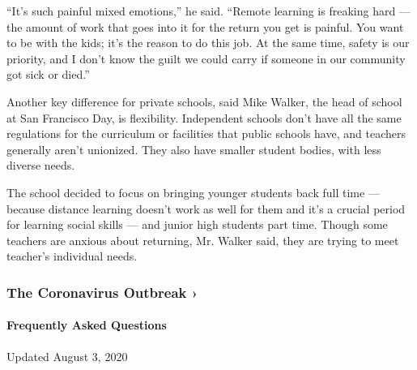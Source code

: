 ``It's such painful mixed emotions,'' he said. ``Remote learning is
freaking hard --- the amount of work that goes into it for the return
you get is painful. You want to be with the kids; it's the reason to do
this job. At the same time, safety is our priority, and I don't know the
guilt we could carry if someone in our community got sick or died.''

Another key difference for private schools, said Mike Walker, the head
of school at San Francisco Day, is flexibility. Independent schools
don't have all the same regulations for the curriculum or facilities
that public schools have, and teachers generally aren't unionized. They
also have smaller student bodies, with less diverse needs.

The school decided to focus on bringing younger students back full time
--- because distance learning doesn't work as well for them and it's a
crucial period for learning social skills --- and junior high students
part time. Though some teachers are anxious about returning, Mr. Walker
said, they are trying to meet teacher's individual needs.

\href{https://www.nytimes.com/news-event/coronavirus?action=click\&pgtype=Article\&state=default\&region=MAIN_CONTENT_3\&context=storylines_faq}{}

\hypertarget{the-coronavirus-outbreak-}{%
\subsubsection{The Coronavirus Outbreak
›}\label{the-coronavirus-outbreak-}}

\hypertarget{frequently-asked-questions}{%
\paragraph{Frequently Asked
Questions}\label{frequently-asked-questions}}

Updated August 3, 2020

